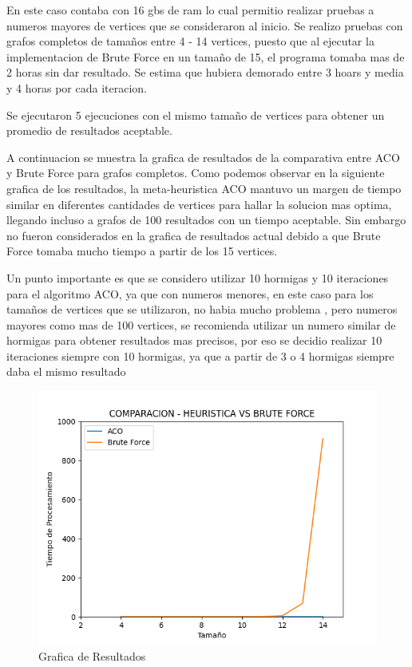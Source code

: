 \documentclass[12pt]{article}
\begin{document}
En este caso contaba con 16 gbs de ram lo cual permitio realizar pruebas a numeros mayores de vertices que se consideraron al inicio.
Se realizo pruebas con grafos completos de tamaños entre 4 - 14 vertices, puesto que al ejecutar la implementacion de Brute Force 
en un tamaño de 15, el programa tomaba mas de 2 horas sin dar resultado. Se estima que hubiera demorado entre 3 hoars y media y 4 horas
por cada iteracion.

Se ejecutaron 5 ejecuciones con el mismo tamaño de vertices para obtener un promedio de resultados aceptable.

A continuacion se muestra la grafica de resultados de la comparativa entre ACO y Brute Force para grafos completos.
Como podemos observar en la siguiente grafica de los resultados, la meta-heuristica ACO mantuvo un margen de tiempo similar en
diferentes cantidades de vertices para hallar la solucion mas optima, llegando incluso a grafos de 100 resultados con un tiempo aceptable. Sin embargo
no fueron considerados en la grafica de resultados actual debido a que Brute Force tomaba mucho tiempo a partir de los 15 vertices.

Un punto importante es que se considero utilizar 10 hormigas y 10 iteraciones para el algoritmo ACO, ya que con numeros menores, en este caso para los tamaños de 
vertices que se utilizaron, no habia mucho problema , pero numeros mayores como mas de 100 vertices, se recomienda utilizar un numero similar de hormigas para obtener
resultados mas precisos, por eso se decidio realizar 10 iteraciones siempre con 10 hormigas, ya que a partir de 3 o 4 hormigas siempre daba el mismo resultado


\begin{figure}[H]
\centering
\includegraphics[width=\textwidth]{heuristica_results}
\caption{Grafica de Resultados}
\end{figure}
\end{document}
